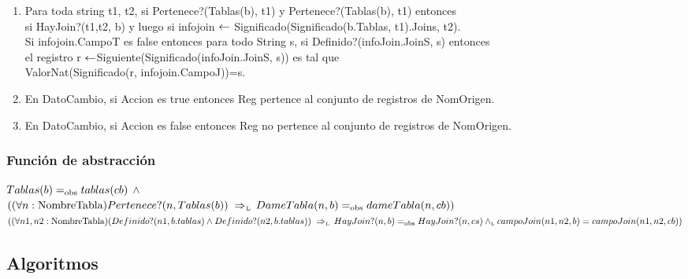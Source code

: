 \begin{enumerate}
  \item Para toda string t1, t2, si Pertenece?(Tablas(b), t1) y Pertenece?(Tablas(b), t1) entonces\\
  si HayJoin?(t1,t2, b) y luego si infojoin $\leftarrow$ Significado(Significado(b.Tablas, t1).Joins, t2).\\
  Si infojoin.CampoT es false entonces para todo String s, si Definido?(infoJoin.JoinS, s) entonces\\
  el registro r $\leftarrow$Siguiente(Significado(infoJoin.JoinS, s)) es tal que \\
  ValorNat(Significado(r, infojoin.CampoJ))=s.
  
  
  
  
  
  \item En DatoCambio, si Accion es true entonces Reg pertence al conjunto de registros de NomOrigen.
  \item En DatoCambio, si Accion es false entonces Reg no pertence al conjunto de registros de NomOrigen.

\end{enumerate}


\subsubsection*{Función de abstracción}

$ Tablas(b)=_{\mathrm{obs}} tablas(cb)$ $\land$ \\
$((\paratodo{NombreTabla}{n}) Pertenece?(n, Tablas(b)) \impluego DameTabla(n, b) \igobs dameTabla(n,cb))$ \\
$((\paratodo{NombreTabla}{n1, n2}) (Definido?(n1, b.tablas) \land Definido?(n2, b.tablas)) \impluego HayJoin?(n, b) \igobs HayJoin?(n,cs) \yluego campoJoin(n1,n2, b)=campoJoin(n1,n2, cb))$ \\



\newpage

\subsection{Algoritmos}



